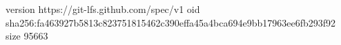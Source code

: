 version https://git-lfs.github.com/spec/v1
oid sha256:fa463927b5813c823751815462c390effa45a4bca694e9bb17963ee6fb293f92
size 95663
